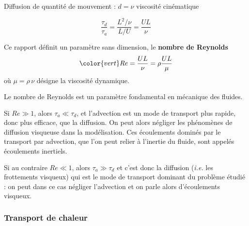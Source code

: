 {\begin{frame}{\insertsubsubsectionhead}

\small

Diffusion de quantité de mouvement : $d=\nu$ viscosité cinématique

\[
	\frac{\tau_d}{\tau_a} = \frac{L^2/\nu}{L/U} = \frac{UL}{\nu} 
\]

\medskip

Ce rapport définit un paramètre sans dimension, le \textbf{nombre de Reynolds}
\[
\color{vert}
	Re = \frac{UL}{\nu} = \rho \frac{UL}{\mu}
\]
o\`u $\mu = \rho \,\nu$ désigne la viscosité dynamique. 

\medskip

Le nombre de Reynolds est un paramètre fondamental en mécanique des fluides. 

\smallskip

Si \textcolor{rouge}{$Re\gg1$}, alors $\tau_a\ll\tau_d$, et l'advection
est un mode de transport plus rapide, donc plus efficace, que la diffusion.
On peut alors négliger les phénomènes de diffusion visqueuse dans la modélisation.
Ces écoulements dominés par le transport par advection, que l'on peut relier à l'inertie du fluide, 
sont appelés \textcolor{rouge}{écoulements inertiels}.

\smallskip

Si au contraire \textcolor{rouge}{$Re\ll1$}, 
alors $\tau_a\gg\tau_d$ et c'est donc la diffusion (\textit{i.e.} les frottements visqueux)
qui est le mode de transport dominant du problème étudié : on peut dans ce cas négliger l'advection
et on parle alors d'\textcolor{rouge}{écoulements visqueux}.

\vspace{15mm}

\end{frame}

\subsubsection{Transport de chaleur}

\begin{frame}{\insertsubsubsectionhead}

\small


\end{frame}}
